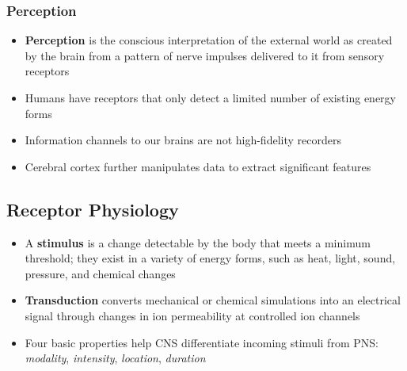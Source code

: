 \documentclass[11pt]{article}
\begin{document}
\subsubsection{Perception}
\begin{itemize}
\item \textbf{Perception} is the conscious interpretation of the external world as created by the brain from a pattern of nerve impulses delivered to it from sensory receptors
\item Humans have receptors that only detect a limited number of existing energy forms
\item Information channels to our brains are not high-fidelity recorders
\item Cerebral cortex further manipulates data to extract significant features 
\end{itemize}




\subsection{Receptor Physiology}
\begin{itemize}
\item A \textbf{stimulus} is a change detectable by the body that meets a minimum threshold; they exist in a variety of energy forms, such as heat, light, sound, pressure, and chemical changes
\item \textbf{Transduction} converts mechanical or chemical simulations into an electrical signal through changes in ion permeability at controlled ion channels
\item Four basic properties help CNS differentiate incoming stimuli from PNS: \textit{modality}, \textit{intensity}, \textit{location}, \textit{duration}
\end{itemize}
\end{document}
